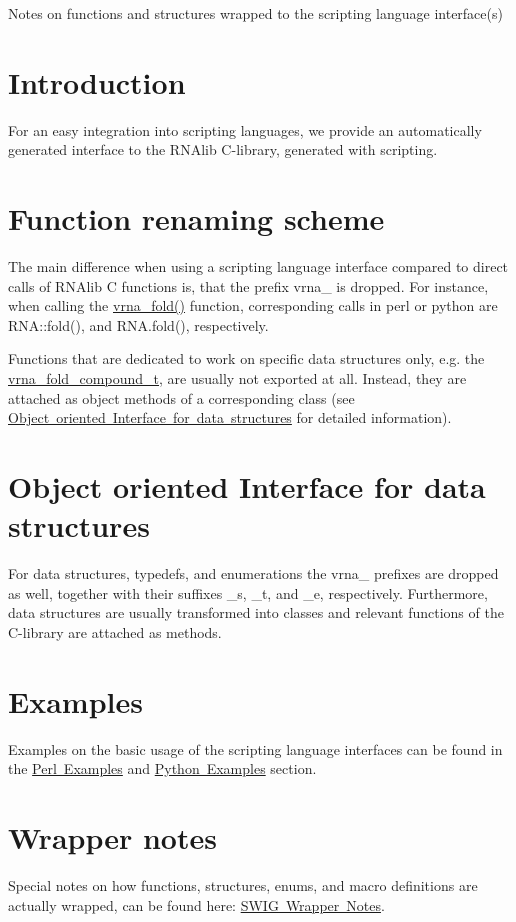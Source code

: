 Notes on functions and structures wrapped to the scripting language interface(s)\hypertarget{scripting_scripting_intro}{}\section{Introduction}\label{scripting_scripting_intro}
For an easy integration into scripting languages, we provide an automatically generated interface to the R\+N\+Alib C-\/library, generated with scripting.\hypertarget{scripting_scripting_renaming}{}\section{Function renaming scheme}\label{scripting_scripting_renaming}
The main difference when using a scripting language interface compared to direct calls of R\+N\+Alib C functions is, that the prefix \textquotesingle{}vrna\+\_\+\textquotesingle{} is dropped. For instance, when calling the \mbox{\hyperlink{group__mfe__fold__single_ga29a33b2895f4e67b0480271ff289afdc}{vrna\+\_\+fold()}} function, corresponding calls in perl or python are R\+N\+A\+::fold(), and R\+N\+A.\+fold(), respectively.

Functions that are dedicated to work on specific data structures only, e.\+g. the \mbox{\hyperlink{group__fold__compound_ga1b0cef17fd40466cef5968eaeeff6166}{vrna\+\_\+fold\+\_\+compound\+\_\+t}}, are usually not exported at all. Instead, they are attached as object methods of a corresponding class (see \mbox{\hyperlink{scripting_scripting_oo_interface}{Object oriented Interface for data structures}} for detailed information).\hypertarget{scripting_scripting_oo_interface}{}\section{Object oriented Interface for data structures}\label{scripting_scripting_oo_interface}
For data structures, typedefs, and enumerations the \textquotesingle{}vrna\+\_\+\textquotesingle{} prefixes are dropped as well, together with their suffixes \textquotesingle{}\+\_\+s\textquotesingle{}, \textquotesingle{}\+\_\+t\textquotesingle{}, and \textquotesingle{}\+\_\+e\textquotesingle{}, respectively. Furthermore, data structures are usually transformed into classes and relevant functions of the C-\/library are attached as methods.\hypertarget{scripting_scripting_examples}{}\section{Examples}\label{scripting_scripting_examples}
Examples on the basic usage of the scripting language interfaces can be found in the \mbox{\hyperlink{mp_example_scripting_perl_examples}{Perl Examples}} and \mbox{\hyperlink{mp_example_scripting_python_examples}{Python Examples}} section.\hypertarget{scripting_scripting_wrappers}{}\section{Wrapper notes}\label{scripting_scripting_wrappers}
Special notes on how functions, structures, enums, and macro definitions are actually wrapped, can be found here\+: \mbox{\hyperlink{wrappers}{S\+W\+IG Wrapper Notes}}. 